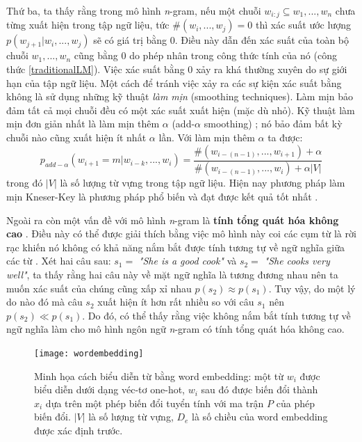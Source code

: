 Thứ ba, ta thấy rằng trong mô hình \textit{n}-gram, nếu một chuỗi $w_{i:j} \subseteq w_1,...,w_n$ chưa từng xuất hiện trong tập ngữ liệu, tức $\# \left(w_i,...,w_j \right) = 0$ thì xác suất ước lượng $p(w_{j+1}|w_i,...,w_j)$ sẽ có giá trị bằng 0. Điều này dẫn đến xác suất của toàn bộ chuỗi $w_1,...,w_n$ cũng bằng 0 do phép nhân trong công thức tính của nó (công thức \ref{traditionalLM}). Việc xác suất bằng 0 xảy ra khá thường xuyên do sự giới hạn của tập ngữ liệu. Một cách để tránh việc xảy ra các sự kiện xác suất bằng không là sử dụng những kỹ thuật \textit{làm mịn} (smoothing techniques). Làm mịn bảo đảm tất cả mọi chuỗi đều có một xác suất xuất hiện (mặc dù nhỏ). Kỹ thuật làm mịn đơn giản nhất là làm mịn thêm $\alpha$ (add-$\alpha$ smoothing) \cite{goodman2001}; nó bảo đảm bất kỳ chuỗi nào cũng xuất hiện ít nhất $\alpha$ lần. Với làm mịn thêm $\alpha$ ta được:
\begin{equation} \label{ngramLMWithSmoothing}
	p_{add-\alpha} \left(w_{i+1}=m|w_{i-k},...,w_{i} \right) = \frac{\# \left(w_{i-(n-1)},...,w_{i+1} \right) + \alpha}{\# \left(w_{i-(n-1)},...,w_{i} \right) + \alpha \left|V \right| }
\end{equation}
trong đó $\left|V \right|$ là số lượng từ vựng trong tập ngữ liệu. Hiện nay phương pháp làm mịn Kneser-Key là phương pháp phổ biến và đạt được kết quả tốt nhất \cite{jurafsky2000}.

Ngoài ra còn một vấn đề với mô hình \textit{n}-gram là \textbf{tính tổng quát hóa không cao} \cite{bengioLM2003}. Điều này có thể được giải thích bằng việc mô hình này coi các cụm từ là rời rạc khiến nó không có khả năng nắm bắt được tính tương tự về ngữ nghĩa giữa các từ \cite{bengioLM2003}. Xét hai câu sau: $s_1 =$ \textit{"She is a good cook"} và $s_2 =$ \textit{"She cooks very well"}, ta thấy rằng hai câu này về mặt ngữ nghĩa là tương đương nhau nên ta muốn xác suất của chúng cũng xấp xỉ nhau $p(s_2) \approx p(s_1)$. Tuy vậy, do một lý do nào đó mà câu $s_2$ xuất hiện ít hơn rất nhiều so với câu $s_1$ nên $p(s_2) \ll p(s_1)$. Do đó, có thể thấy rằng việc không nắm bắt tính tương tự về ngữ nghĩa làm cho mô hình ngôn ngữ \textit{n}-gram có tính tổng quát hóa không cao.

\begin{figure}
	\centering
	\texttt{[image: wordembedding]}
	\caption[Minh họa cách biểu diễn từ bằng word embedding]{Minh họa cách biểu diễn từ bằng word embedding: một từ $w_i$ được biểu diễn dưới dạng véc-tơ one-hot, $w_i$ sau đó được biến đổi thành $x_i$ dựa trên một phép biến đổi tuyển tính với ma trận $P$ của phép biến đổi. $|V|$ là số lượng từ vựng, $D_e$ là số chiều của word embedding được xác định trước.}
	\label{fig_wordembedding}
\end{figure}

